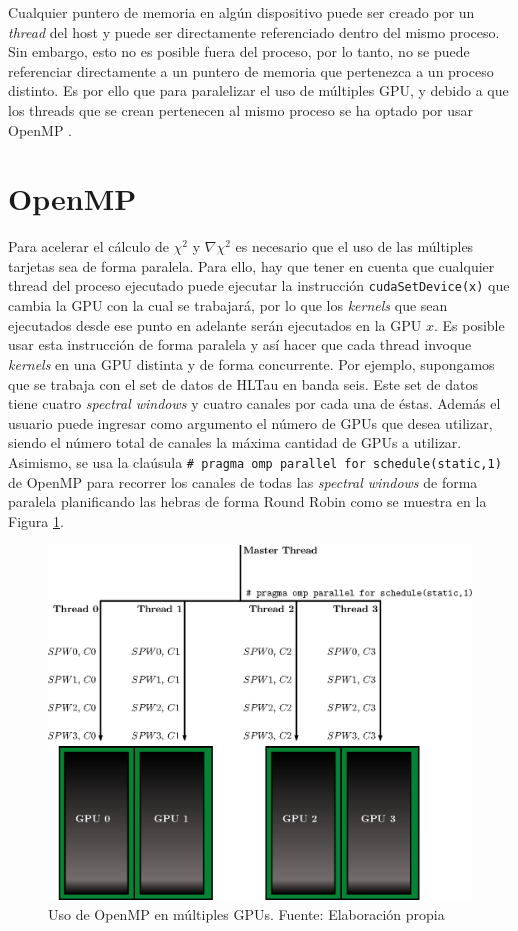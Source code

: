 Cualquier puntero de memoria en algún dispositivo puede ser creado por un \textit{thread} del host y puede ser directamente referenciado dentro del mismo proceso. Sin embargo, esto no es posible fuera del proceso, por lo tanto, no se puede referenciar directamente a un puntero de memoria que pertenezca a un proceso distinto. Es por ello que para paralelizar el uso de múltiples GPU, y debido a que los threads que se crean pertenecen al mismo proceso se ha optado por usar OpenMP \citep{cuda}.

\section{OpenMP}

Para acelerar el cálculo de $\chi^{2}$ y $\nabla \chi^{2}$ es necesario que el uso de las múltiples tarjetas sea de forma paralela. Para ello, hay que tener en cuenta que cualquier thread del proceso ejecutado puede ejecutar la instrucción \texttt{cudaSetDevice(x)} que cambia la GPU con la cual se trabajará, por lo que los \textit{kernels} que sean ejecutados desde ese punto en adelante serán ejecutados en la GPU $x$. Es posible usar esta instrucción de forma paralela y así hacer que cada thread invoque \textit{kernels} en una GPU distinta y de forma concurrente. Por ejemplo, supongamos que se trabaja con el set de datos de HLTau en banda seis. Este set de datos tiene cuatro \textit{spectral windows} y cuatro canales por cada una de éstas. Además el usuario puede ingresar como argumento el número de GPUs que desea utilizar, siendo el número total de canales la máxima cantidad de GPUs a utilizar. Asimismo, se usa la claúsula \texttt{\# pragma omp parallel for schedule(static,1)} de OpenMP para recorrer los canales de todas las \textit{spectral windows} de forma paralela planificando las hebras de forma Round Robin como se muestra en la Figura \ref{fig:openmp}.

\begin{figure}[h!]
	\centering
	\includegraphics[scale=0.8]{./images/openmp.eps}
	\caption{Uso de OpenMP en múltiples GPUs. Fuente: Elaboración propia}
	\label{fig:openmp}
\end{figure}

